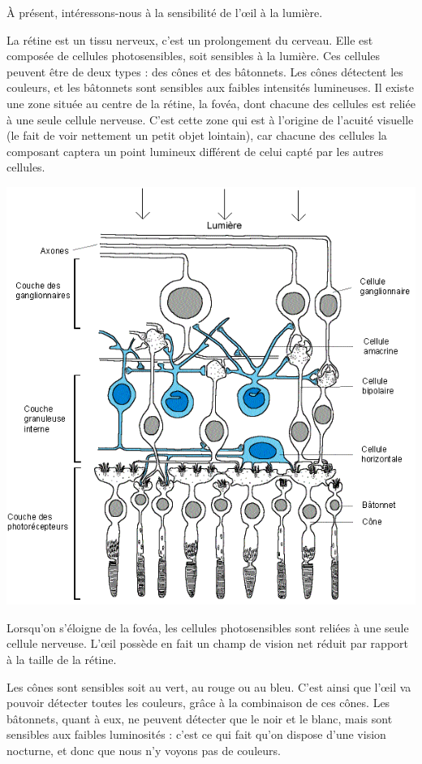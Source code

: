 \documentclass[a4paper, 12pt, onecolumn, openany]{report}
\begin{document}
	\newpage
	
	À présent, intéressons-nous à la sensibilité de l’œil à la lumière.
	
	La rétine est un tissu nerveux, c’est un prolongement du cerveau. Elle est composée de cellules photosensibles, soit sensibles à la lumière. Ces cellules peuvent être de deux types : des cônes et des bâtonnets. Les cônes détectent les couleurs, et les bâtonnets sont sensibles aux faibles intensités lumineuses. Il existe une zone située au centre de la rétine, la fovéa, dont chacune des cellules est reliée à une seule cellule nerveuse. C’est cette zone qui est à l’origine de l’acuité visuelle (le fait de voir nettement un petit objet lointain), car chacune des cellules la composant captera un point lumineux différent de celui capté par les autres cellules.
	
	\includegraphics[scale=0.5]{retine.png}
	
	Lorsqu’on s’éloigne de la fovéa, les cellules photosensibles sont reliées à une seule cellule nerveuse. L’œil possède en fait un champ de vision net réduit par rapport à la taille de la rétine.
	
	Les cônes sont sensibles soit au vert, au rouge ou au bleu. C’est ainsi que l’œil va pouvoir détecter toutes les couleurs, grâce à la combinaison de ces cônes. Les bâtonnets, quant à eux, ne peuvent détecter que le noir et le blanc, mais sont sensibles aux faibles luminosités : c’est ce qui fait qu’on dispose d’une vision nocturne, et donc que nous n’y voyons pas de couleurs.
	
\end{document}
